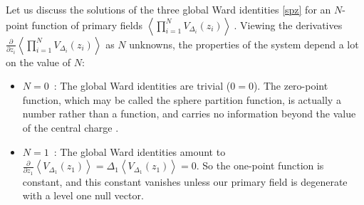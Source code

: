 \documentclass[12pt, a4paper, notitlepage, twoside]{report}
\numberwithin{equation}{section}
\theoremstyle{break}
\begin{document}
Let us discuss the solutions of the three global Ward identities \eqref{spz} for an $N$-point function of primary fields
$
\left\langle \prod_{i=1}^N V_{\Delta_i}(z_i) \right\rangle\ .
$
Viewing the derivatives $\frac{\partial}{\partial z_i}\left\langle \prod_{i=1}^N V_{\Delta_i}(z_i) \right\rangle$ as $N$ unknowns, the properties of the system depend a lot on the value of $N$:
\begin{itemize}
 \item $\boxed{N=0}$\ : The global Ward identities are trivial ($0=0$).
The zero-point function, which may be called the sphere partition function, is actually a number rather than a function, and carries no information beyond the value of the central charge \cite{car01}.

\item $\boxed{N=1}$\ :  The global Ward identities amount to $\frac{\partial}{\partial z_1}\left\langle V_{\Delta_1}(z_1)\right\rangle  =\Delta_1 \left\langle V_{\Delta_1}(z_1)\right\rangle =0$.
So the one-point function is constant, and this constant vanishes unless our primary field is degenerate with a level one null vector.


\end{itemize}
\end{document}
